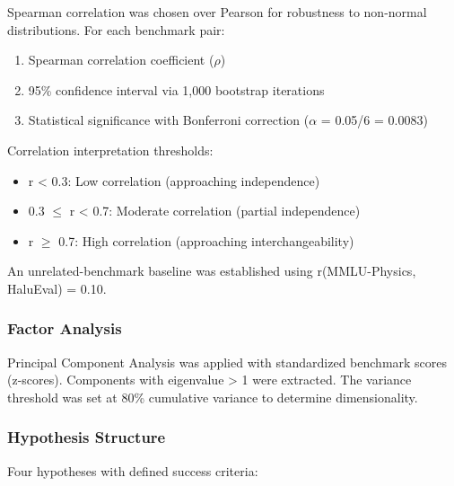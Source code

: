 Spearman correlation was chosen over Pearson for robustness to non-normal distributions. For each benchmark pair:

\begin{enumerate}
\item Spearman correlation coefficient ($\rho$)
\item 95\% confidence interval via 1,000 bootstrap iterations
\item Statistical significance with Bonferroni correction ($\alpha$ = 0.05/6 = 0.0083)
\end{enumerate}

Correlation interpretation thresholds:
\begin{itemize}
\item r < 0.3: Low correlation (approaching independence)
\item 0.3 $\leq$ r < 0.7: Moderate correlation (partial independence)
\item r $\geq$ 0.7: High correlation (approaching interchangeability)
\end{itemize}

An unrelated-benchmark baseline was established using r(MMLU-Physics, HaluEval) = 0.10.

\subsubsection{Factor Analysis}

Principal Component Analysis was applied with standardized benchmark scores (z-scores). Components with eigenvalue > 1 were extracted. The variance threshold was set at 80\% cumulative variance to determine dimensionality.

\subsubsection{Hypothesis Structure}

Four hypotheses with defined success criteria:

\begin{table}[htbp]
\centering
{}
\end{table}
